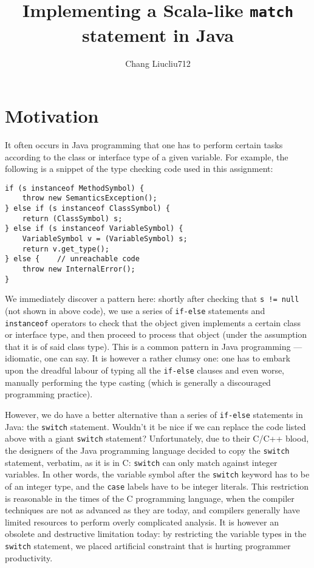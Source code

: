 \documentclass[twocolumn]{article}
\begin{document}
\title{Implementing a Scala-like {\tt match} statement in Java}
\author{Chang Liu\quad cliu712}
\maketitle

\section{Motivation}
It often occurs in Java programming that one has to
perform certain tasks according to the class or interface type
of a given variable. For example, the following is a snippet
of the type checking code used in this assignment:
\begin{verbatim}
if (s instanceof MethodSymbol) {
    throw new SemanticsException();
} else if (s instanceof ClassSymbol) {
    return (ClassSymbol) s;
} else if (s instanceof VariableSymbol) {
    VariableSymbol v = (VariableSymbol) s;
    return v.get_type();
} else {    // unreachable code
    throw new InternalError();
}
\end{verbatim}

We immediately discover a pattern here: shortly after checking that
\verb|s != null| (not shown in above code), we use a series of \verb|if-else| statements and
\verb|instanceof| operators to check that the object given implements
a certain class or interface type, and then proceed to process
that object (under the assumption that it is of said class type).
This is a common pattern in Java programming --- idiomatic, one
can say. It is however a rather clumsy one: one has to embark
upon the dreadful labour of typing all the \verb|if-else| clauses
and even worse, manually performing the type casting (which is generally
a discouraged programming practice).

However, we do have a better alternative than a series of \verb|if-else|
statements in Java: the \verb|switch| statement. Wouldn't it be nice if we
can replace the code listed above with a giant \verb|switch| statement? Unfortunately,
due to their C/C++ blood, the designers of the Java programming language decided to
copy the \verb|switch|
statement, verbatim, as it is in C: \verb|switch| can only match against
integer variables. In other words, the variable symbol after the \verb|switch|
keyword has to be of an integer type, and the \verb|case| labels have to
be integer literals. This restriction is reasonable in the times of the
C programming language, when the compiler techniques are not as advanced
as they are today, and compilers generally have limited resources to perform
overly complicated analysis. It is however an obsolete and destructive
limitation today:
by restricting the variable types in the \verb|switch| statement,
we placed artificial constraint that is hurting programmer productivity.
\end{document}
